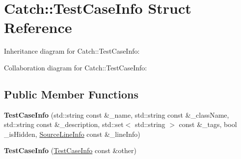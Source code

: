\hypertarget{structCatch_1_1TestCaseInfo}{}\section{Catch\+:\+:Test\+Case\+Info Struct Reference}
\label{structCatch_1_1TestCaseInfo}


Inheritance diagram for Catch\+:\+:Test\+Case\+Info\+:


Collaboration diagram for Catch\+:\+:Test\+Case\+Info\+:
\subsection*{Public Member Functions}
\begin{DoxyCompactItemize}
\item 
{\bfseries Test\+Case\+Info} (std\+::string const \&\+\_\+name, std\+::string const \&\+\_\+class\+Name, std\+::string const \&\+\_\+description, std\+::set$<$ std\+::string $>$ const \&\+\_\+tags, bool \+\_\+is\+Hidden, \hyperlink{structCatch_1_1SourceLineInfo}{Source\+Line\+Info} const \&\+\_\+line\+Info)\hypertarget{structCatch_1_1TestCaseInfo_a6bd4c4e3fab75ba12f6592d3e3bf8c34}{}\label{structCatch_1_1TestCaseInfo_a6bd4c4e3fab75ba12f6592d3e3bf8c34}

\item 
{\bfseries Test\+Case\+Info} (\hyperlink{structCatch_1_1TestCaseInfo}{Test\+Case\+Info} const \&other)\hypertarget{structCatch_1_1TestCaseInfo_ac338adb4e38f4bf3977fb45b2b1fe447}{}\label{structCatch_1_1TestCaseInfo_ac338adb4e38f4bf3977fb45b2b1fe447}

\end{DoxyCompactItemize}
